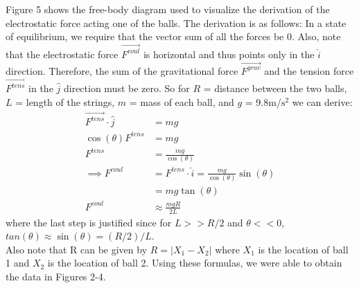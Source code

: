 \documentclass[oneside,12pt]{amsart}
\begin{document}
	\indent Figure 5 shows the free-body diagram used to visualize the derivation of the electrostatic force acting one of the balls. The derivation is as follows: In a state of equilibrium, we require that the vector sum of all the forces be 0. Also, note that the electrostatic force $\vec{F^{coul}}$ is horizontal and thus points only in the $\hat{i}$ direction. Therefore, the sum of the gravitational force $\vec{F^{grav}}$ and the tension force $\vec{F^{tens}}$ in the $\hat{j}$ direction must be zero. So for $R$ = distance between the two balls, $L$ = length of the strings, $m$ = mass of each ball, and $g$ = 9.8m/$\text{s}^2$ we can derive:
	\begin{align*}
		\vec{F^{tens}} \cdot \hat{j} &= mg\\
		\cos(\theta)F^{tens} &= mg\\
		F^{tens} &= \frac{mg}{\cos(\theta)}\\
		\implies F^{coul} &= F^{tens}\cdot \hat{i} = \frac{mg}{\cos(\theta)}\sin(\theta)\\
		&=mg\tan(\theta)\\
		F^{coul} &\approx \frac{mgR}{2L}
	\end{align*}
	where the last step is justified since for $L>>R/2$ and $\theta << 0$, $tan(\theta) \approx \sin(\theta) = (R/2)/L$.\\
	
	\indent Also note that R can be given by $R = |X_1-X_2|$ where $X_1$ is the location of ball 1 and $X_2$ is the location of ball 2. Using these formulas, we were able to obtain the data in Figures 2-4.\\
	 
\end{document}
